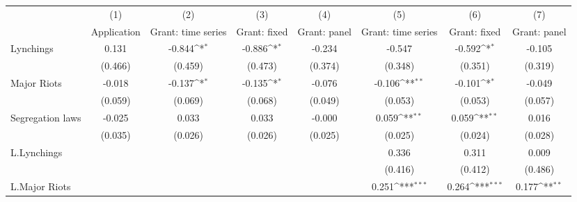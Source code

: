 {
\def\sym#1{\ifmmode^{#1}\else\(^{#1}\)\fi}
\begin{tabular}{l*{7}{c}}
\hline\hline
                    &\multicolumn{1}{c}{(1)}&\multicolumn{1}{c}{(2)}&\multicolumn{1}{c}{(3)}&\multicolumn{1}{c}{(4)}&\multicolumn{1}{c}{(5)}&\multicolumn{1}{c}{(6)}&\multicolumn{1}{c}{(7)}\\
                    &\multicolumn{1}{c}{Application}&\multicolumn{1}{c}{Grant: time series}&\multicolumn{1}{c}{Grant: fixed}&\multicolumn{1}{c}{Grant: panel}&\multicolumn{1}{c}{Grant: time series}&\multicolumn{1}{c}{Grant: fixed}&\multicolumn{1}{c}{Grant: panel}\\
\hline
Lynchings           &       0.131         &      -0.844\sym{*}  &      -0.886\sym{*}  &      -0.234         &      -0.547         &      -0.592\sym{*}  &      -0.105         \\
                    &     (0.466)         &     (0.459)         &     (0.473)         &     (0.374)         &     (0.348)         &     (0.351)         &     (0.319)         \\
[1em]
Major Riots         &      -0.018         &      -0.137\sym{*}  &      -0.135\sym{*}  &      -0.076         &      -0.106\sym{**} &      -0.101\sym{*}  &      -0.049         \\
                    &     (0.059)         &     (0.069)         &     (0.068)         &     (0.049)         &     (0.053)         &     (0.053)         &     (0.057)         \\
[1em]
Segregation laws    &      -0.025         &       0.033         &       0.033         &      -0.000         &       0.059\sym{**} &       0.059\sym{**} &       0.016         \\
                    &     (0.035)         &     (0.026)         &     (0.026)         &     (0.025)         &     (0.025)         &     (0.024)         &     (0.028)         \\
[1em]
L.Lynchings         &                     &                     &                     &                     &       0.336         &       0.311         &       0.009         \\
                    &                     &                     &                     &                     &     (0.416)         &     (0.412)         &     (0.486)         \\
[1em]
L.Major Riots       &                     &                     &                     &                     &       0.251\sym{***}&       0.264\sym{***}&       0.177\sym{**} \\

\end{tabular}}
